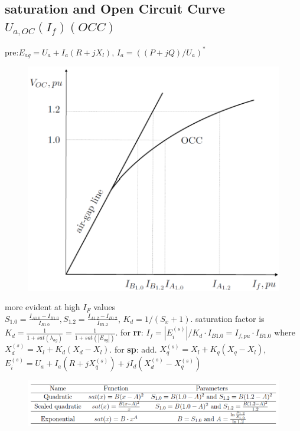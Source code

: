 \documentclass[a4paper,10pt,landscape]{scrartcl}
\begin{document}
\begin{multicols*}{3}
\subsection{saturation and Open Circuit Curve $U_{a,OC}(I_f) (OCC)$}
pre:$E_{ag}=U_a+I_a(R+jX_l)$, $I_a=\left((P+jQ)/U_a\right)^*$
\begin{figure}
    \centering
    \includegraphics[width=\linewidth]{src/saturation.png}
\end{figure}
more evident at high $I_F$ values \\
$S_{1.0}=\frac{I_{A1.0}-I_{B1.0}}{I_{B1.0}}, S_{1.2}=\frac{I_{A1.2}-I_{B1.2}}{I_{B1.2}} $, $K_d=1/(S_x+1)$. saturation factor is $K_d=\frac{1}{1 + sat(\lambda_{ag})}=\frac{1}{1 + sat(|E_{ag}|)}$. for \textbf{rr}: $I_f=|E_i^{(s)}|/K_d\cdot I_{B1.0}=I_{f,pu}\cdot I_{B1.0}$ where $X_d^{(s)}=X_l+K_d(X_d-X_l)$. for \textbf{sp}: add. $X_q^{(s)}=X_l+K_q(X_q-X_l)$, $E_i^{(s)}=U_a+I_a\left(R+jX_q^{(s)}\right)+jI_d(X_d^{(s)} - X_q^{(s)})$ 
\vspace{-.3cm}
\begin{figure}[H]
    \centering
    \includegraphics[width=\linewidth,right]{src/saturation functions.png}
\end{figure}

\end{multicols*}
\end{document}
